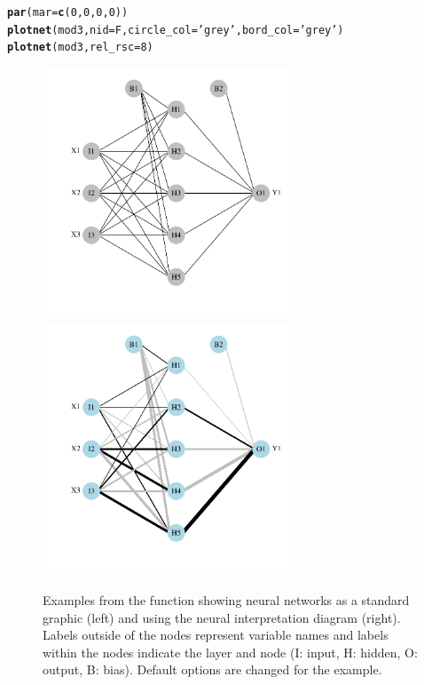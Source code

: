\documentclass[article,shortnames]{jss}\usepackage[]{graphicx}\usepackage[]{color}
\makeatletter
\newcommand{\hlnum}[1]{\textcolor[rgb]{0.686,0.059,0.569}{#1}}%
\newcommand{\hlstr}[1]{\textcolor[rgb]{0.192,0.494,0.8}{#1}}%
\newcommand{\hlstd}[1]{\textcolor[rgb]{0.345,0.345,0.345}{#1}}%
\newcommand{\hlkwc}[1]{\textcolor[rgb]{0.333,0.667,0.333}{#1}}%
\newcommand{\hlkwd}[1]{\textcolor[rgb]{0.737,0.353,0.396}{\textbf{#1}}}%
\newenvironment{kframe}{%
 \def\at@end@of@kframe{}%
 \ifinner\ifhmode%
  \def\at@end@of@kframe{\end{minipage}}%
  \begin{minipage}{\columnwidth}%
 \fi\fi%
 \def\FrameCommand##1{\hskip\@totalleftmargin \hskip-\fboxsep
 \colorbox{shadecolor}{##1}\hskip-\fboxsep
     \hskip-\linewidth \hskip-\@totalleftmargin \hskip\columnwidth}%
 \MakeFramed {\advance\hsize-\width
   \@totalleftmargin\z@ \linewidth\hsize
   \@setminipage}}%
 {\par\unskip\endMakeFramed%
 \at@end@of@kframe}
\makeatother
\begin{document}
\begin{kframe}
\begin{alltt}
\hlkwd{par}\hlstd{(}\hlkwc{mar} \hlstd{=} \hlkwd{c}\hlstd{(}\hlnum{0}\hlstd{,} \hlnum{0}\hlstd{,} \hlnum{0}\hlstd{,} \hlnum{0}\hlstd{))}
\hlkwd{plotnet}\hlstd{(mod3,} \hlkwc{nid} \hlstd{= F,} \hlkwc{circle_col} \hlstd{=} \hlstr{'grey'}\hlstd{,} \hlkwc{bord_col} \hlstd{=} \hlstr{'grey'}\hlstd{)}
\hlkwd{plotnet}\hlstd{(mod3,} \hlkwc{rel_rsc} \hlstd{=} \hlnum{8}\hlstd{)}
\end{alltt}
\end{kframe}\begin{figure}[!ht]

{\centering \includegraphics[width=7.5cm,height=7.5cm]{figs/plotnet-1} 
\includegraphics[width=7.5cm,height=7.5cm]{figs/plotnet-2} 

}

\caption[Examples from the  function showing neural networks as a standard graphic (left) and using the neural interpretation diagram (right)]{Examples from the  function showing neural networks as a standard graphic (left) and using the neural interpretation diagram (right).  Labels outside of the nodes represent variable names and labels within the nodes indicate the layer and node (I: input, H: hidden, O: output, B: bias).  Default options are changed for the example.}\label{fig:plotnet}
\end{figure}
\end{document}
